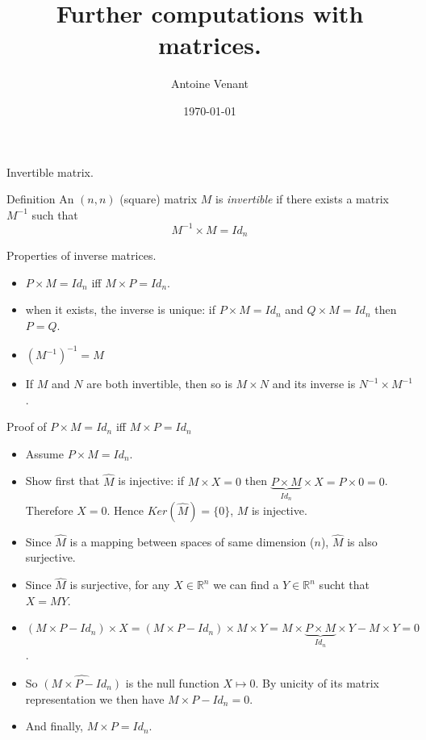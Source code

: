 \documentclass{beamer}
\begin{document}
\title{Further computations with matrices.} 
\author{Antoine Venant}
\date{\today}

\maketitle

\begin{frame}{Invertible matrix.}

  \begin{block}{Definition}
    An $(n,n)$ (square) matrix $M$ is \emph{invertible} if there exists a matrix $M^{-1}$ such that
    \[ M^{-1} \times M = Id_n \]
  \end{block}

  \begin{block}{Properties of inverse matrices.}
    \begin{itemize}
    \item $P \times M = Id_n$ iff $M \times P = Id_n$.  
    \item when it exists, the inverse is unique: if $P \times M = Id_n$ and $Q \times M = Id_n$ then $P = Q$.
    \item $(M^{-1})^{-1} = M$
    \item If $M$ and $N$ are both invertible, then so is $M \times N$ and its inverse is $N^{-1}\times M^{-1}$.
    \end{itemize}
  \end{block}
\end{frame}

\begin{frame}{Proof of $P \times M = Id_n$ iff $M \times P = Id_n$}
  \begin{itemize}
  \item Assume $P\times M = Id_n$.
  \item Show first that $\widehat{M}$ is injective: if $M \times X = 0$ then $\underbrace{P \times M}_{Id_n} \times X = P \times 0 = 0$. Therefore $X = 0$. Hence $Ker(\widehat{M}) = \{0\}$, $M$ is injective.
  \item Since $\widehat{M}$ is a mapping between spaces of same dimension ($n$), $\widehat{M}$ is also surjective.
  \item Since $\widehat{M}$ is surjective,  for any $X \in \mathbb{R}^n$ we can find a $Y \in \mathbb{R}^n$ sucht that $X = M Y$.
  \item $(M\times P - Id_n ) \times X =  (M \times P - Id_n) \times M \times Y = M \times \underbrace{P \times M}_{Id_n} \times Y - M \times Y = 0$.
  \item So $\widehat{(M\times P - Id_n )}$ is the null function $X \mapsto 0$. By unicity of its matrix representation we then have $M\times P - Id_n =  0$.
  \item And finally, $M \times P = Id_n$.
  \end{itemize}
\end{frame}
\end{document}
